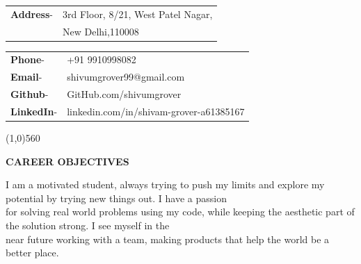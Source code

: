 \documentclass[10pt]{article}
\begin{document}
\begin{minipage}{0.5\textwidth}

\vspace{5mm}
\hspace{3mm}
\begin{tabular}{l l}\raggedleft
\color{black!70}\textbf{Address}-& \color{black!70}3rd Floor, 8/21, West Patel Nagar, \\  
    
    & \color{black!70}New Delhi,110008\\

\end{tabular}
\end{minipage}
\begin{minipage}{0.4\textwidth}

\vspace{5mm}
\begin{flushright}
\begin{tabular}{l l}\raggedleft

\color{black!70}\textbf{Phone}-& \color{black!70}+91 9910998082\\ 
\color{black!70}\textbf{Email}-& \color{black!70}shivumgrover99@gmail.com\\
\color{black!70}\textbf{Github}-& \color{black!70}GitHub.com/shivumgrover\\
\color{black!70}\textbf{LinkedIn}-& \color{black!70}linkedin.com/in/shivam-grover-a61385167\\
\end{tabular}
\end{flushright}
\end{minipage}



\begin{center}
\line(1,0){560}
\end{center}

\begin{minipage}{\textwidth}
\vspace{5mm}
\begin{huge}
\textbf{\color{theme}CAREER OBJECTIVES}
\end{huge}
\begin{mdframed}[backgroundcolor=theme]
\end{mdframed}

\vspace{1mm}

\color{black}\normalsize{{I am a motivated student, always trying to push my limits and explore my potential by trying new things out. I have a passion\\ for solving real world problems using my code, while keeping the aesthetic part of the solution strong. I see myself in the\\ near future working with a team, making products that help the world be a better place.
}}
\end{minipage}
\end{document}
